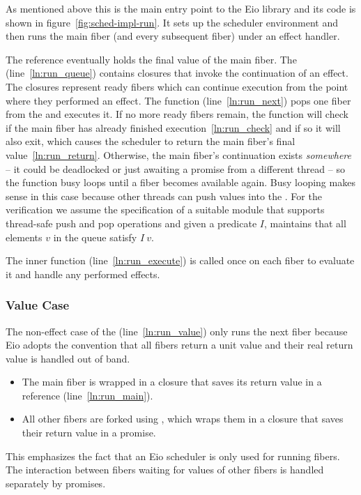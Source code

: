 As mentioned above this is the main entry point to the Eio library and its code is shown in figure~\ref{fig:sched-impl-run}.
It sets up the scheduler environment and then runs the main fiber (and every subsequent fiber) under an effect handler.

The  reference eventually holds the final value of the main fiber.
The  (line~\ref{ln:run_queue}) contains closures that invoke the continuation of an effect.
The closures represent ready fibers which can continue execution from the point where they performed an effect.
The  function (line~\ref{ln:run_next}) pops one fiber from the  and executes it.
If no more ready fibers remain, the function will check if the main fiber has already finished execution~\ref{ln:run_check} and if so it will also exit, which causes the scheduler to return the main fiber's final value~\ref{ln:run_return}.
Otherwise, the main fiber's continuation exists \emph{somewhere} -- it could be deadlocked or just awaiting a promise from a different thread -- so the  function busy loops until a fiber becomes available again.
Busy looping makes sense in this case because other threads can push values into the .
For the verification we assume the specification of a suitable  module that supports thread-safe push and pop operations and given a predicate \(I\), maintains that all elements \(v\) in the queue satisfy \(I~v\).

The inner  function (line~\ref{ln:run_execute}) is called once on each fiber to evaluate it and handle any performed effects.
\subsubsection*{Value Case}
The non-effect case of the  (line~\ref{ln:run_value}) only runs the next fiber because Eio adopts the convention that all fibers return a unit value and their real return value is handled out of band.
\begin{itemize}
  \item The main fiber is wrapped in a closure that saves its return value in a reference (line~\ref{ln:run_main}).
  \item All other fibers are forked using , which wraps them in a closure that saves their return value in a promise.
\end{itemize}

This emphasizes the fact that an Eio scheduler is only used for running fibers.
The interaction between fibers waiting for values of other fibers is handled separately by promises.

